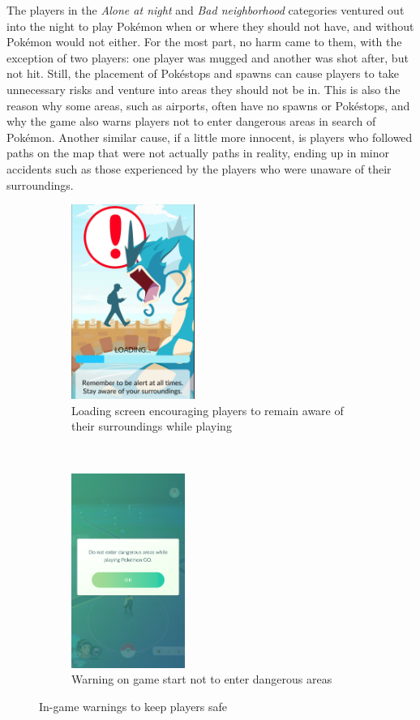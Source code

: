 The players in the \emph{Alone at night} and \emph{Bad neighborhood} categories ventured out into the night to play Pokémon when or where they should not have, and without Pokémon would not either. For the most part, no harm came to them, with the exception of two players: one player was mugged \cite{savannahMugging} and another was shot after, but not hit. Still, the placement of Pokéstops and spawns can cause players to take unnecessary risks and venture into areas they should not be in. This is also the reason why some areas, such as airports, often have no spawns or Pokéstops, and why the game also warns players not to enter dangerous areas in search of Pokémon. Another similar cause, if a little more innocent, is players who followed paths on the map that were not actually paths in reality, ending up in minor accidents such as those experienced by the players who were unaware of their surroundings.

\begin{figure}[h]
	\centering
	\begin{subfigure}[t]{0.4\textwidth}
		\centering
		\includegraphics[height=2.5in]{Figures/pogo-loading-screen}
		\caption{Loading screen encouraging players to remain aware of their surroundings while playing}
	\end{subfigure}
	~
	\begin{subfigure}[t]{0.4\textwidth}
		\centering
		\includegraphics[height=2.5in]{Figures/pogo-warning-dangerous-areas-lazy_panda42}
		\caption{Warning on game start not to enter dangerous areas}
	\end{subfigure}
	\caption{In-game warnings to keep players safe}
	\label{fig:game-warning-stay-safe}
\end{figure}


